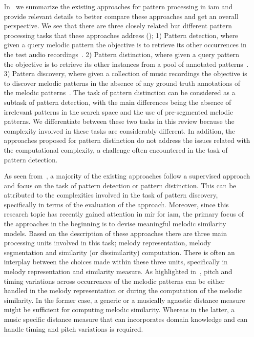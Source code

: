 {In~ we summarize the existing approaches for pattern processing in \gls{iam} and provide relevant details to better compare these approaches and get an overall perspective. We see that there are three closely related but different pattern processing tasks that these approaches address (); 1) Pattern detection, where given a query melodic pattern the objective is to retrieve its other occurrences in the test audio recordings~\citep{Ross2012,Ross2012b,Ishwar2013,dutta2014modified,ganguli2015efficient}. 2) Pattern distinction, where given a query pattern the objective is to retrieve its other instances from a pool of annotated patterns~\citep{ishwar2012motivic,rao2013distinguishing,Rao2014}. 3) Pattern discovery, where given a collection of music recordings the objective is to discover melodic patterns in the absence of any ground truth annotations of the melodic patterns~\citep{Dutta2014}. The task of pattern distinction can be considered as a subtask of pattern detection, with the main differences being the absence of irrelevant patterns in the search space and the use of pre-segmented melodic patterns. We differentiate between these two tasks in this review because the complexity involved in these tasks are considerably different. In addition, the approaches proposed for pattern distinction do not address the issues related with the computational complexity, a challenge often encountered in the task of pattern detection.

As seen from~, a majority of the existing approaches follow a supervised approach and focus on the task of pattern detection or pattern distinction. This can be attributed to the complexities involved in the task of pattern discovery, specifically in terms of the evaluation of the approach. Moreover, since this research topic has recently gained attention in \gls{mir} for \gls{iam}, the primary focus of the approaches in the beginning is to devise meaningful melodic similarity models. Based on the description of these approaches there are three main processing units involved in this task; melody representation, melody segmentation and similarity (or dissimilarity) computation. There is often an interplay between the choices made within these three units, specifically in melody representation and similarity measure. As highlighted in~\cite{gomez2003melody}, pitch and timing variations across occurrences of the melodic patterns can be either handled in the melody representation or during the computation of the melodic similarity. In the former case, a generic or a musically agnostic distance measure might be sufficient for computing melodic similarity. Whereas in the latter, a music specific distance measure that can incorporates domain knowledge and can handle timing and pitch variations is required. 

}

